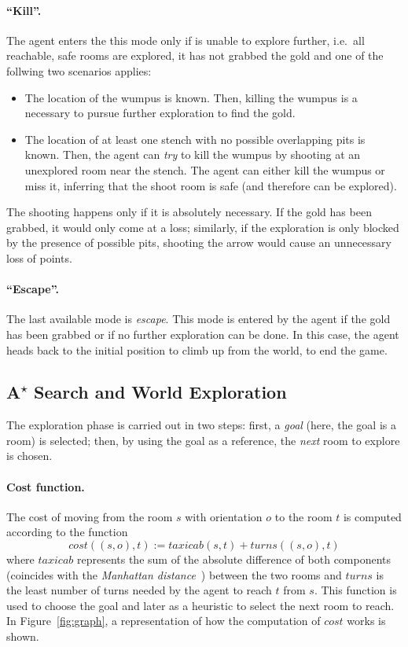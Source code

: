 \documentclass{llncs}
\begin{document}
\paragraph{\enquote{Kill}.} The agent enters the this mode only if is unable to explore further, i.e.\ all reachable, safe rooms are explored, it has not grabbed the gold and one of the follwing two scenarios applies:
\begin{itemize}
	\item The location of the wumpus is known. Then, killing the wumpus is a necessary to pursue further exploration to find the gold.
	\item The location of at least one stench with no possible overlapping pits is known. Then, the agent can \emph{try} to kill the wumpus by shooting at an unexplored room near the stench.
	The agent can either kill the wumpus or miss it, inferring that the shoot room is safe (and therefore can be explored).
\end{itemize}
The shooting happens only if it is absolutely necessary.
If the gold has been grabbed, it would only come at a loss; similarly, if the exploration is only blocked by the presence of possible pits, shooting the arrow would cause an unnecessary loss of points.

\paragraph{\enquote{Escape}.} The last available mode is \emph{escape}.
This mode is entered by the agent if the gold has been grabbed or if no further exploration can be done.
In this case, the agent heads back to the initial position to climb up from the world, to end the game.

\subsection{A\textsuperscript{$\star$} Search and World Exploration}

The exploration phase is carried out in two steps: first, a \emph{goal} (here, the goal is a room) is selected; then, by using the goal as a reference, the \emph{next} room to explore is chosen.

\paragraph{Cost function.} The cost of moving from the room $s$ with orientation $o$ to the room $t$ is computed according to the function
\begin{equation}
	cost((s,o),t) := taxicab(s,t) + turns((s,o),t)
\end{equation}
where $taxicab$ represents the sum of the absolute difference of both components (coincides with the \emph{Manhattan distance}~\cite{Manhattan}) between the two rooms and $turns$ is the least number of turns needed by the agent to reach $t$ from $s$.
This function is used to choose the goal and later as a heuristic to select the next room to reach.
In Figure~\ref{fig:graph}, a representation of how the computation of $cost$ works is shown.
\end{document}
